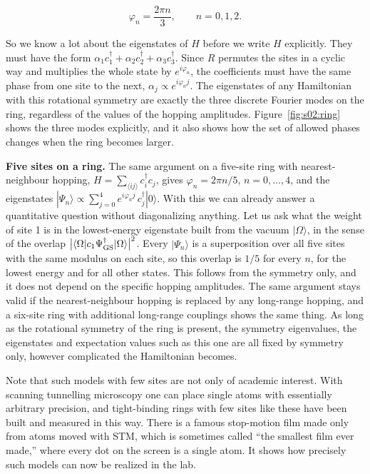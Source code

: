 \begin{equation}\varphi_n = \frac{2\pi n}{3}, \qquad n=0,1,2.\end{equation}

So we know a lot about the eigenstates of $H$ before we write $H$ explicitly. They must have the form
$\alpha_1c_1^\dagger+\alpha_2c_2^\dagger+\alpha_3c_3^\dagger$. Since $R$ permutes the sites in a
cyclic way and multiplies the whole state by $e^{i\varphi_n}$, the coefficients must have the same
phase from one site to the next, $\alpha_j\propto e^{i\varphi_n j}$. The eigenstates of any
Hamiltonian with this rotational symmetry are exactly the three discrete Fourier modes on the ring,
regardless of the values of the hopping amplitudes. Figure~\ref{fig:s02:ring} shows the three modes
explicitly, and it also shows how the set of allowed phases changes when the ring becomes larger.



\textbf{Five sites on a ring.} The same argument on a five-site ring with nearest-neighbour hopping,
$H=\sum_{\langle ij\rangle} c_i^\dagger c_j$, gives $\varphi_n=2\pi n/5$, $n=0,\dots,4$, and the
eigenstates $|\Psi_n\rangle \propto \sum_{j=0}^4 e^{i\varphi_n j}\,c_j^\dagger|0\rangle$. With this
we can already answer a quantitative question without diagonalizing anything. Let us ask what the
weight of site 1 is in the lowest-energy eigenstate built from the vacuum $|\Omega\rangle$, in the
sense of the overlap $\big|\langle\Omega|c_1\Psi_{\rm GS}^\dagger|\Omega\rangle\big|^2$. Every
$|\Psi_n\rangle$ is a superposition over all five sites with the same modulus on each site, so this
overlap is $1/5$ for every $n$, for the lowest energy and for all other states. This follows from the
symmetry only, and it does not depend on the specific hopping amplitudes. The same argument stays
valid if the nearest-neighbour hopping is replaced by any long-range hopping, and a six-site ring
with additional long-range couplings shows the same thing. As long as the rotational symmetry of the
ring is present, the symmetry eigenvalues, the eigenstates and expectation values such as this one
are all fixed by symmetry only, however complicated the Hamiltonian becomes.

Note that such models with few sites are not only of academic interest. With scanning tunnelling
microscopy one can place single atoms with essentially arbitrary precision, and tight-binding rings
with few sites like these have been built and measured in this way. There is a famous stop-motion
film made only from atoms moved with STM, which is sometimes called ``the smallest film ever made,''
where every dot on the screen is a single atom. It shows how precisely such models can now be realized in the lab.

